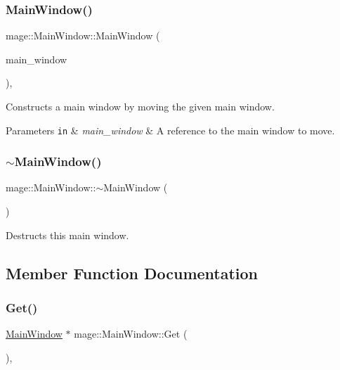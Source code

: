 \subsubsection{\texorpdfstring{Main\+Window()}{MainWindow()}\hspace{0.1cm}{\footnotesize\ttfamily [3/3]}}
{\footnotesize\ttfamily mage\+::\+Main\+Window\+::\+Main\+Window (\begin{DoxyParamCaption}\item[{\hyperlink{classmage_1_1_main_window}{Main\+Window} \&\&}]{main\+\_\+window }\end{DoxyParamCaption})\hspace{0.3cm}{\ttfamily [default]}, {\ttfamily [noexcept]}}

Constructs a main window by moving the given main window.


\begin{DoxyParams}[1]{Parameters}
\mbox{\tt in}  & {\em main\+\_\+window} & A reference to the main window to move. \\
\hline
\end{DoxyParams}
\hypertarget{classmage_1_1_main_window_ada7ecf97d82ce08ba2f31f0afd891031}{}\label{classmage_1_1_main_window_ada7ecf97d82ce08ba2f31f0afd891031} 
\subsubsection{\texorpdfstring{$\sim$\+Main\+Window()}{~MainWindow()}}
{\footnotesize\ttfamily mage\+::\+Main\+Window\+::$\sim$\+Main\+Window (\begin{DoxyParamCaption}{ }\end{DoxyParamCaption})}

Destructs this main window. 

\subsection{Member Function Documentation}
\hypertarget{classmage_1_1_main_window_ab670605775c88e0121afa7a52ac88ddf}{}\label{classmage_1_1_main_window_ab670605775c88e0121afa7a52ac88ddf} 
\subsubsection{\texorpdfstring{Get()}{Get()}}
{\footnotesize\ttfamily \hyperlink{classmage_1_1_main_window}{Main\+Window} $\ast$ mage\+::\+Main\+Window\+::\+Get (\begin{DoxyParamCaption}{ }\end{DoxyParamCaption})\hspace{0.3cm}{\ttfamily [static]}, {\ttfamily [noexcept]}}


